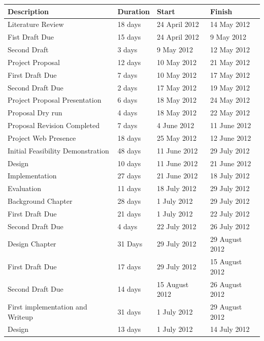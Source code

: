 \documentclass[12pt,a4paper]{article}
\begin{document}
\begin{tabular}{l||l|l|l}
    Description & Duration & Start & Finish \\
    \hline  \hline
    Literature Review & 18 days & 24 April 2012 & 14 May 2012 \\
    \indent Fist Draft Due & 15 days  & 24 April 2012  & 9 May 2012  \\
    \indent Second Draft & 3 days & 9 May 2012 & 12 May 2012 \\
    \hline
    Project Proposal & 12 days & 10 May 2012  & 21 May 2012 \\
    \indent First Draft Due & 7 days & 10 May 2012 & 17 May 2012 \\
    \indent Second Draft Due & 2 days  & 17 May 2012  & 19 May 2012 \\
    \hline
    Project Proposal Presentation & 6 days  & 18 May 2012 & 24 May 2012 \\
    \indent Proposal Dry run & 4 days & 18 May 2012 & 22 May 2012 \\
    \hline
    Proposal Revision Completed & 7 days & 4 June 2012 & 11 June 2012 \\
    \hline
    Project Web Presence & 18 days  & 25 May 2012 & 12 June 2012 \\
    \hline
    Initial Feasibility Demonstration & 48 days & 11 June 2012 & 29 July 2012 \\
    \indent Design & 10 days & 11 June 2012 & 21 June 2012 \\
    \indent Implementation & 27 days & 21 June 2012 & 18 July 2012 \\
    \indent Evaluation & 11 days & 18 July 2012 & 29 July 2012 \\
    \hline
    Background Chapter & 28 days & 1 July 2012  & 29 July 2012 \\
    \indent First Draft Due & 21 days & 1 July 2012 & 22 July 2012 \\
    \indent Second Draft Due & 4 days  & 22 July 2012 & 26 July 2012 \\
    \hline
    Design Chapter & 31 Days & 29 July 2012 & 29 August 2012 \\
    \indent First Draft Due & 17 days  & 29 July 2012 & 15 August 2012 \\
    \indent Second Draft Due & 14 days & 15 August 2012  & 26 August 2012 \\
    \hline
    First implementation and Writeup & 31 days & 1 July 2012 & 29 August 2012 \\
    \indent Design & 13 days & 1 July 2012 & 14 July 2012 \\

\end{tabular}
\end{document}
